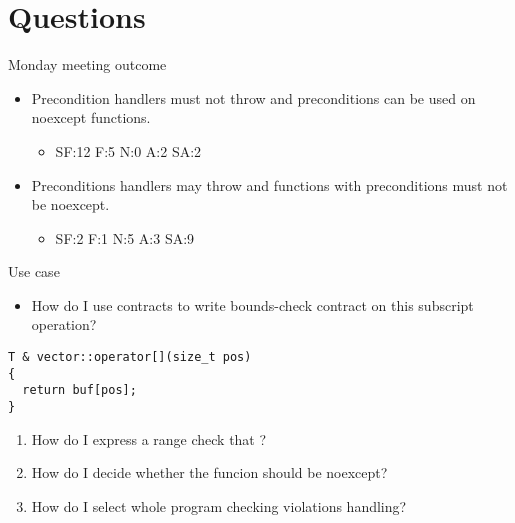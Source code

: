 \section{Questions}

\begin{frame}[t]{Monday meeting outcome}
\begin{itemize}
  \item Precondition handlers must not throw and preconditions can be used on noexcept functions.
    \begin{itemize}
      \item SF:12 F:5 N:0 A:2 SA:2
    \end{itemize}

  \vfill
  \item Preconditions handlers may throw and functions with preconditions must not be noexcept.
    \begin{itemize}
      \item SF:2 F:1 N:5 A:3 SA:9
    \end{itemize}
\end{itemize}
\end{frame}

\begin{frame}[t,fragile]{Use case}
\begin{itemize}
  \item How do I use contracts to write bounds-check contract on this subscript operation?
\end{itemize}
\begin{lstlisting}
T & vector::operator[](size_t pos)
{
  return buf[pos];
}
\end{lstlisting}
\pause
\begin{enumerate}
  \item How do I express a range check that  \cppkey{<=}  \cppkey{<=} ?
  \item How do I decide whether the funcion should be noexcept?
  \item How do I select whole program checking violations handling?
\end{enumerate}
\end{frame}
